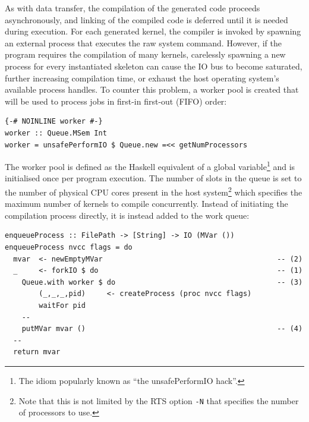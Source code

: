 As with data transfer, the compilation of the generated \CUDA code proceeds
asynchronously, and linking of the compiled code is deferred until it is needed
during execution. For each generated kernel, the \CUDA compiler is invoked by
spawning an external process that executes the raw system command. However, if
the program requires the compilation of many kernels, carelessly spawning a new
process for every instantiated skeleton can cause the IO bus to become
saturated, further increasing compilation time, or exhaust the host operating
system's available process handles. To counter this problem, a worker pool is
created that will be used to process jobs in first-in first-out (FIFO) order:
%
\begin{lstlisting}[style=haskell]
{-# NOINLINE worker #-}
worker :: Queue.MSem Int
worker = unsafePerformIO $ Queue.new =<< getNumProcessors
\end{lstlisting}

The worker pool is defined as the Haskell equivalent of a global
variable\footnote{The idiom popularly known as ``the unsafePerformIO hack''.}
and is initialised once per program execution. The number of slots in the queue
is set to the number of physical CPU cores present in the host
system\footnote{Note that this is not limited by the RTS option \texttt{-N} that
specifies the number of processors to use.} which specifies the maximum number
of kernels to compile concurrently. Instead of initiating the compilation
process directly, it is instead added to the work queue:
%
\begin{lstlisting}[style=haskell,firstnumber=last]
enqueueProcess :: FilePath -> [String] -> IO (MVar ())
enqueueProcess nvcc flags = do
  mvar  <- newEmptyMVar                                         -- (2)
  _     <- forkIO $ do                                          -- (1)
    Queue.with worker $ do                                      -- (3)
        (_,_,_,pid)     <- createProcess (proc nvcc flags)
        waitFor pid
    --
    putMVar mvar ()                                             -- (4)
  --
  return mvar
\end{lstlisting}

